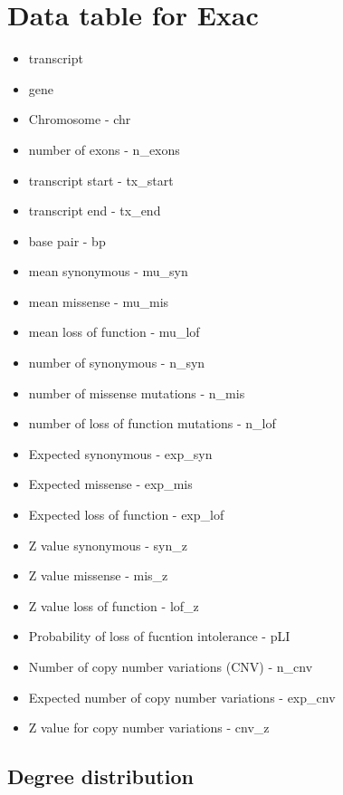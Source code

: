 \section{Data table for Exac}
\label{sec:supplemental data table for exac}
\begin{itemize}
    \item { transcript}
    \item{gene}
    \item{Chromosome - chr}
    \item{number of exons - n\_exons}
    \item{transcript start - tx\_start}
    \item{transcript end - tx\_end}
    \item{base pair - bp}
    \item{mean synonymous - mu\_syn}
    \item{mean missense - mu\_mis}
    \item{mean loss of function - mu\_lof}
    \item{number of synonymous - n\_syn}
    \item{number of missense mutations - n\_mis}
    \item{number of loss of function mutations - n\_lof}
    \item{Expected synonymous - exp\_syn}
    \item{Expected missense - exp\_mis}
    \item{Expected loss of function - exp\_lof}
    \item{Z value synonymous - syn\_z}
    \item{Z value missense - mis\_z}
    \item{Z value loss of function - lof\_z}
    \item{Probability of loss of fucntion intolerance - pLI}
    \item{Number of copy number variations (CNV) - n\_cnv}
    \item{Expected number of copy number variations - exp\_cnv}
    \item{Z value for copy number variations - cnv\_z}
    
\end{itemize}

\subsection{Degree distribution}

